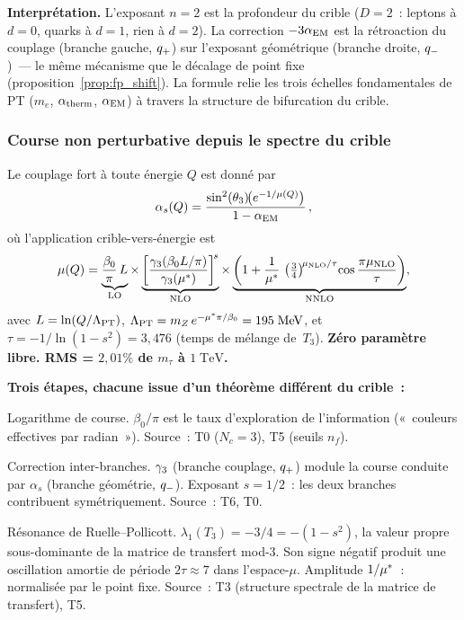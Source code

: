 \documentclass[12pt,a4paper]{article}
\begin{document}
\noindent
\textbf{Interprétation.} L'exposant $n = 2$ est la profondeur du
crible ($D = 2$~: leptons à $d = 0$, quarks à $d = 1$, rien à
$d = 2$). La correction $-3\alpha_{\mathrm{EM}}$ est la rétroaction du couplage
(branche gauche, $q_{+}$) sur l'exposant géométrique (branche
droite, $q_{-}$)~--- le même mécanisme que le décalage de point
fixe (proposition~\ref{prop:fp_shift}). La formule relie les trois
échelles fondamentales de PT ($m_e$, $\alpha_{\rm therm}$,
$\alpha_{\mathrm{EM}}$) à travers la structure de bifurcation du crible.

\subsubsection{Course non perturbative depuis le spectre du crible}
\label{sec:ch9_running}

\begin{proposition}
\label{prop:NNLO_running}
Le couplage fort à toute énergie $Q$ est donné par
\begin{equation}
  \alpha_s(Q)
  = \frac{\sin^2(\theta_{3})\!\bigl(e^{-1/\mu(Q)}\bigr)}{1 - \alpha_{\mathrm{EM}}}\,,
  \label{eq:alpha_s_exact}
\end{equation}
où l'application crible-vers-énergie est
\begin{equation}
  \mu(Q) = \underbrace{\frac{\beta_0}{\pi}\,L}_{\rm LO}
  \times
  \underbrace{\left[\frac{\gamma_{3}(\beta_0 L/\pi)}
                         {\gamma_{3}({\mu^{*}})}\right]^{\!s}}_{\rm NLO}
  \times
  \underbrace{\left(1 + \frac{1}{{\mu^{*}}}\,
  \left(\tfrac{3}{4}\right)^{\!\mu_{\rm NLO}/\tau}
  \!\cos\frac{\pi\mu_{\rm NLO}}{\tau}\right)}_{\rm NNLO},
  \label{eq:NNLO_mapping}
\end{equation}
avec $L = \ln(Q/\Lambda_{\rm PT})$,
$\Lambda_{\rm PT} = m_Z\,e^{-{\mu^{*}}\pi/\beta_0} = 195\;\mathrm{MeV}$,
et $\tau = -1/\ln(1-s^2) = 3{,}476$ (temps de mélange de~$T_3$).
\textbf{Zéro paramètre libre. RMS = $2{,}01\%$ de $m_\tau$ à
$1\;\mathrm{TeV}$.}
\end{proposition}

\noindent
\textbf{Trois étapes, chacune issue d'un théorème différent du crible~:}
\begin{description}[nosep, leftmargin=1.5em]
\item[LO] Logarithme de course.
  $\beta_0/\pi$ est le taux d'exploration de l'information
  («~couleurs effectives par radian~»). Source~: T0 ($N_c = 3$),
  T5 (seuils $n_f$).
\item[NLO] Correction inter-branches.
  $\gamma_{3}$ (branche couplage, $q_{+}$) module la course
  conduite par $\alpha_s$ (branche géométrie, $q_{-}$). Exposant
  $s = 1/2$~: les deux branches contribuent symétriquement. Source~:
  T6, T0.
\item[NNLO] Résonance de Ruelle--Pollicott.
  $\lambda_1(T_3) = -3/4 = -(1 - s^2)$, la valeur propre
  sous-dominante de la matrice de transfert mod-3. Son signe négatif
  produit une oscillation amortie de période $2\tau \approx 7$ dans
  l'espace-$\mu$. Amplitude $1/{\mu^{*}}$~: normalisée par le point
  fixe. Source~: T3 (structure spectrale de la matrice de transfert),
  T5.
\end{description}
\end{document}
